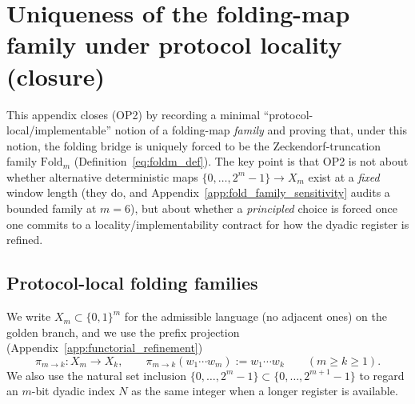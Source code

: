 \section[Uniqueness of folding-map family]{Uniqueness of the folding-map family under protocol locality (closure)}
\label{app:fold_family_uniqueness}

This appendix closes (OP2) by recording a minimal ``protocol-local/implementable'' notion of a folding-map \emph{family} and proving that, under this notion, the folding bridge is uniquely forced to be the Zeckendorf-truncation family $\mathrm{Fold}_m$ (Definition~\eqref{eq:foldm_def}).
The key point is that OP2 is not about whether alternative deterministic maps $\{0,\dots,2^m-1\}\to X_m$ exist at a \emph{fixed} window length (they do, and Appendix~\ref{app:fold_family_sensitivity} audits a bounded family at $m=6$), but about whether a \emph{principled} choice is forced once one commits to a locality/implementability contract for how the dyadic register is refined.

\begin{center}
\end{center}

\subsection{Protocol-local folding families}
\label{subsec:protocol_local_fold_family}

We write $X_m\subset\{0,1\}^m$ for the admissible language (no adjacent ones) on the golden branch, and we use the prefix projection (Appendix~\ref{app:functorial_refinement})
\[
\pi_{m\to k}:X_m\to X_k,\qquad
\pi_{m\to k}(w_1\cdots w_m):=w_1\cdots w_k
\qquad (m\ge k\ge 1).
\]
We also use the natural set inclusion $\{0,\dots,2^m-1\}\subset\{0,\dots,2^{m+1}-1\}$ to regard an $m$-bit dyadic index $N$ as the same integer when a longer register is available.

